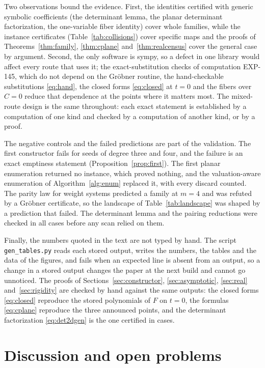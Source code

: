 \documentclass[11pt]{article}
\theoremstyle{definition}
\theoremstyle{remark}
\begin{document}
Two observations bound the evidence. First, the identities certified with generic symbolic coefficients (the determinant lemma, the planar determinant factorization, the one-variable fiber identity) cover whole families, while the instance certificates (Table~\ref{tab:collisions}) cover specific maps and the proofs of Theorems~\ref{thm:family}, \ref{thm:cplane} and~\ref{thm:realcensus} cover the general case by argument. Second, the only software is sympy, so a defect in one library would affect every route that uses it; the exact-substitution checks of computation EXP-145, which do not depend on the Gr\"obner routine, the hand-checkable substitutions \eqref{eq:hand}, the closed forms \eqref{eq:closed} at $t = 0$ and the fibers over $C = 0$ reduce that dependence at the points where it matters most. The mixed-route design is the same throughout: each exact statement is established by a computation of one kind and checked by a computation of another kind, or by a proof.

The negative controls and the failed predictions are part of the validation. The first constructor fails for seeds of degree three and four, and the failure is an exact emptiness statement (Proposition~\ref{prop:first}). The first planar enumeration returned no instance, which proved nothing, and the valuation-aware enumeration of Algorithm~\ref{alg:enum} replaced it, with every discard counted. The parity law for weight systems predicted a family at $m = 4$ and was refuted by a Gr\"obner certificate, so the landscape of Table~\ref{tab:landscape} was shaped by a prediction that failed. The determinant lemma and the pairing reductions were checked in all \numLemmaCases{} cases before any scan relied on them.

Finally, the numbers quoted in the text are not typed by hand. The script \texttt{gen\_tables.py} reads each stored output, writes the numbers, the tables and the data of the figures, and fails when an expected line is absent from an output, so a change in a stored output changes the paper at the next build and cannot go unnoticed. The proofs of Sections~\ref{sec:constructor}, \ref{sec:asymptotic}, \ref{sec:real} and~\ref{sec:rigidity} are checked by hand against the same outputs: the closed forms \eqref{eq:closed} reproduce the stored polynomials of $F$ on $t = 0$, the formulas \eqref{eq:cplane} reproduce the three announced points, and the determinant factorization \eqref{eq:det2dgen} is the one certified in \numRigCases{} cases.

\section{Discussion and open problems}\label{sec:discussion}
\end{document}
